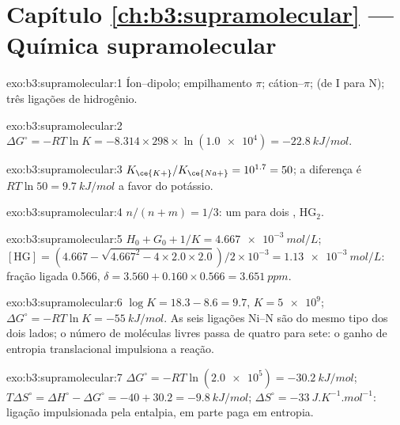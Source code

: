 \section*{Capítulo \ref{ch:b3:supramolecular} --- Química supramolecular}

\begin{solution}{exo:b3:supramolecular:1}
Íon--dipolo; empilhamento $\pi$; cátion--$\pi$;  (de I para N); três ligações de hidrogênio.
\end{solution}

\begin{solution}{exo:b3:supramolecular:2}
$\Delta G^\circ = -RT\ln K = -8.314 \times 298 \times \ln(\num{1.0e4}) = \qty{-22.8}{kJ/mol}$.
\end{solution}

\begin{solution}{exo:b3:supramolecular:3}
$K_{\ce{K+}}/K_{\ce{Na+}} = 10^{1.7} = 50$; a diferença é $RT\ln 50 = \qty{9.7}{kJ/mol}$ a favor do potássio.
\end{solution}

\begin{solution}{exo:b3:supramolecular:4}
$n/(n + m) = 1/3$: um  para dois , $\mathrm{HG_2}$.
\end{solution}

\begin{solution}{exo:b3:supramolecular:5}
$H_0 + G_0 + 1/K = \qty{4.667e-3}{mol/L}$; $[\mathrm{HG}] = (4.667 - \sqrt{4.667^2 - 4 \times 2.0 \times 2.0})/2 \times 10^{-3} = \qty{1.13e-3}{mol/L}$: fração
ligada 0.566, $\delta = 3.560 + 0.160 \times 0.566 = \qty{3.651}{ppm}$.
\end{solution}

\begin{solution}{exo:b3:supramolecular:6}
$\log K = 18.3 - 8.6 = 9.7$, $K = \num{5e9}$; $\Delta G^\circ = -RT\ln K = \qty{-55}{kJ/mol}$. As seis ligações Ni--N são do
mesmo tipo dos dois lados; o número de moléculas livres passa de quatro para
sete: o ganho de entropia translacional impulsiona a reação.
\end{solution}

\begin{solution}{exo:b3:supramolecular:7}
$\Delta G^\circ = -RT\ln(\num{2.0e5}) = \qty{-30.2}{kJ/mol}$; $T\Delta S^\circ = \Delta H^\circ - \Delta G^\circ = -40 + 30.2 = \qty{-9.8}{kJ/mol}$;
$\Delta S^\circ = \qty{-33}{J.K^{-1}.mol^{-1}}$: ligação impulsionada pela entalpia, em parte paga em entropia.
\end{solution}


